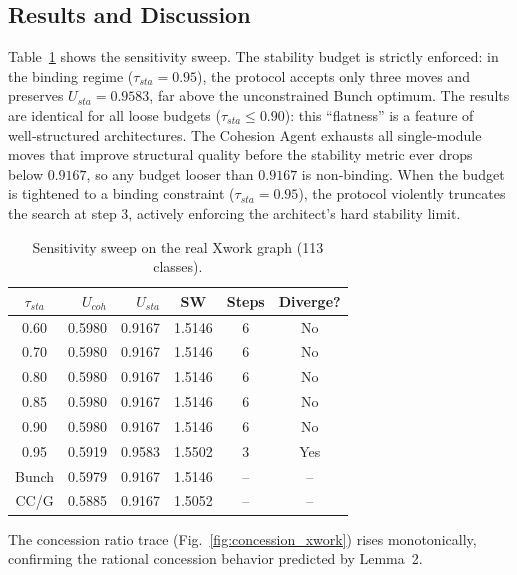\documentclass[conference]{IEEEtran}
\begin{document}
\subsection{Results and Discussion}
Table~\ref{tab:sens_xwork} shows the sensitivity sweep. The stability budget is strictly enforced: in the binding regime ($\tau_{sta}=0.95$), the protocol accepts only three moves and preserves $U_{sta}=0.9583$, far above the unconstrained Bunch optimum. The results are identical for all loose budgets ($\tau_{sta} \le 0.90$): this “flatness” is a feature of well‑structured architectures. The Cohesion Agent exhausts all single‑module moves that improve structural quality before the stability metric ever drops below $0.9167$, so any budget looser than $0.9167$ is non‑binding. When the budget is tightened to a binding constraint ($\tau_{sta}=0.95$), the protocol violently truncates the search at step 3, actively enforcing the architect's hard stability limit.

\begin{table}[t]
\centering
\caption{Sensitivity sweep on the real Xwork graph (113 classes).}
\label{tab:sens_xwork}
\begin{tabular}{c|r|r|c|c|c}
\toprule
$\tau_{sta}$ & $U_{coh}$ & $U_{sta}$ & SW & Steps & Diverge? \\
\midrule
0.60 & 0.5980 & 0.9167 & 1.5146 & 6 & No \\
0.70 & 0.5980 & 0.9167 & 1.5146 & 6 & No \\
0.80 & 0.5980 & 0.9167 & 1.5146 & 6 & No \\
0.85 & 0.5980 & 0.9167 & 1.5146 & 6 & No \\
0.90 & 0.5980 & 0.9167 & 1.5146 & 6 & No \\
0.95 & 0.5919 & 0.9583 & 1.5502 & 3 & Yes \\
\midrule
Bunch & 0.5979 & 0.9167 & 1.5146 & -- & -- \\
CC/G  & 0.5885 & 0.9167 & 1.5052 & -- & -- \\
\bottomrule
\end{tabular}
\end{table}

The concession ratio trace (Fig.~\ref{fig:concession_xwork}) rises monotonically, confirming the rational concession behavior predicted by Lemma~2.
\end{document}

